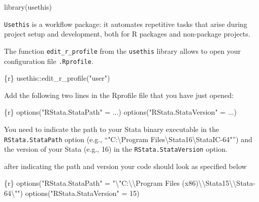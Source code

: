 \documentclass[
  letterpaper,
  DIV=11,
  numbers=noendperiod,
  oneside]{scrreprt}
\newenvironment{Shaded}{\begin{snugshade}}{\end{snugshade}}
\newcommand{\DecValTok}[1]{\textcolor[rgb]{0.68,0.00,0.00}{#1}}
\newcommand{\FunctionTok}[1]{\textcolor[rgb]{0.28,0.35,0.67}{#1}}
\newcommand{\InformationTok}[1]{\textcolor[rgb]{0.37,0.37,0.37}{#1}}
\newcommand{\NormalTok}[1]{\textcolor[rgb]{0.00,0.23,0.31}{#1}}
\newcommand{\OtherTok}[1]{\textcolor[rgb]{0.00,0.23,0.31}{#1}}
\newcommand{\SpecialCharTok}[1]{\textcolor[rgb]{0.37,0.37,0.37}{#1}}
\newcommand{\StringTok}[1]{\textcolor[rgb]{0.13,0.47,0.30}{#1}}
\begin{document}
\begin{Shaded}
\begin{Highlighting}[]
\FunctionTok{library}\NormalTok{(usethis)}
\end{Highlighting}
\end{Shaded}

\texttt{Usethis} is a workflow package: it automates repetitive tasks
that arise during project setup and development, both for R packages and
non-package projects.

The function \texttt{edit\_r\_profile} from the \texttt{usethis} library
allows to open your configuration file \texttt{.Rprofile}.

\begin{Shaded}
\begin{Highlighting}[]
\InformationTok{\textasciigrave{}\textasciigrave{}\textasciigrave{}\{r\}}
\NormalTok{usethis}\SpecialCharTok{::}\FunctionTok{edit\_r\_profile}\NormalTok{(}\StringTok{"user"}\NormalTok{)}
\InformationTok{\textasciigrave{}\textasciigrave{}\textasciigrave{}}
\end{Highlighting}
\end{Shaded}

Add the following two lines in the Rprofile file that you have just
opened:

\begin{Shaded}
\begin{Highlighting}[]
\InformationTok{\textasciigrave{}\textasciigrave{}\textasciigrave{}\{r\}}
\FunctionTok{options}\NormalTok{(}\StringTok{"RStata.StataPath"} \OtherTok{=}\NormalTok{ ...)}
\FunctionTok{options}\NormalTok{(}\StringTok{"RStata.StataVersion"} \OtherTok{=}\NormalTok{ ...)}
\InformationTok{\textasciigrave{}\textasciigrave{}\textasciigrave{}}
\end{Highlighting}
\end{Shaded}

You need to indicate the path to your Stata binary executable in the
\texttt{RStata.StataPath} option (e.g., ``"C:\textbackslash Program
Files\textbackslash Stata16\textbackslash StataIC-64"'') and the version
of your Stata (e.g., 16) in the \texttt{RStata.StataVersion} option.

after indicating the path and version your code should look as specified
below

\begin{Shaded}
\begin{Highlighting}[]
\InformationTok{\textasciigrave{}\textasciigrave{}\textasciigrave{}\{r\}}
\FunctionTok{options}\NormalTok{(}\StringTok{"RStata.StataPath"} \OtherTok{=} \StringTok{"}\SpecialCharTok{\textbackslash{}"}\StringTok{C:}\SpecialCharTok{\textbackslash{}\textbackslash{}}\StringTok{Program Files (x86)}\SpecialCharTok{\textbackslash{}\textbackslash{}}\StringTok{Stata15}\SpecialCharTok{\textbackslash{}\textbackslash{}}\StringTok{Stata{-}64}\SpecialCharTok{\textbackslash{}"}\StringTok{"}\NormalTok{)}
\FunctionTok{options}\NormalTok{(}\StringTok{"RStata.StataVersion"} \OtherTok{=} \DecValTok{15}\NormalTok{)}
\InformationTok{\textasciigrave{}\textasciigrave{}\textasciigrave{}}
\end{Highlighting}
\end{Shaded}
\end{document}
